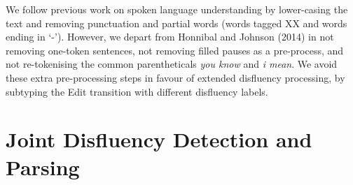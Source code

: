 \documentclass[11pt,letterpaper]{article}
\begin{document}

We follow previous work on spoken language understanding by lower-casing the text
and removing punctuation and partial words (words tagged XX and words ending in
`-').  However, we depart from Honnibal and Johnson (2014) in not removing one-token
sentences, not removing filled pauses as a pre-process, and not
re-tokenising the common parentheticals \emph{you know} and \emph{i mean}.
We avoid these extra pre-processing steps in favour of extended disfluency processing,
by subtyping the Edit transition with different disfluency labels.

\section{Joint Disfluency Detection and Parsing}
\label{sec:model}
\end{document}
